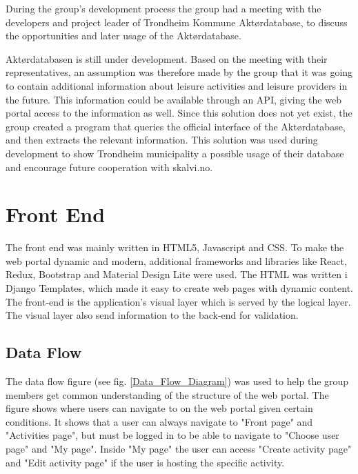 During the group's development process the group had a meeting with the developers and project leader of Trondheim Kommune Aktørdatabase, to discuss the opportunities and later usage of the Aktørdatabase.

Aktørdatabasen is still under development. Based on the meeting with their representatives, an assumption was therefore made by the group that it was going to contain additional information about leisure activities and leisure providers in the future. This information could be available through an API, giving the web portal access to the information as well. Since this solution does not yet exist, the group created a program that queries the official interface of the Aktørdatabase, and then extracts the relevant information. This solution was used during development to show Trondheim municipality a possible usage of their database and encourage future cooperation with skalvi.no. 

\section{Front End}
The front end was mainly written in HTML5, Javascript and CSS. To make the web portal dynamic and modern, additional frameworks and libraries like React, Redux, Bootstrap and Material Design Lite were used. The HTML was written i Django Templates, which made it easy to create web pages with dynamic content. The front-end is the application's visual layer which is served by the logical layer. The visual layer also send information to the back-end for validation.


\subsection{Data Flow}
The data flow figure (see fig. \ref{Data_Flow_Diagram}) was used to help the group members get common understanding of the structure of the web portal. The figure shows where users can navigate to on the web portal given certain conditions. It shows that a user can always navigate to "Front page" and "Activities page", but must be logged in to be able to navigate to "Choose user page" and "My page". Inside "My page" the user can access "Create activity page" and "Edit activity page" if the user is hosting the specific activity. 

